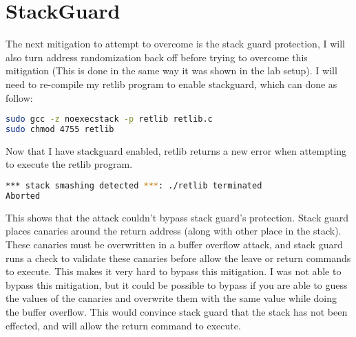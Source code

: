 \documentclass[14pt]{extarticle}
\begin{document}
\section{StackGuard}
The next mitigation to attempt to overcome is the stack guard protection, I will also turn address randomization back off before trying to overcome this mitigation (This is done in the same way it was shown in the lab setup). I will need to re-compile my retlib program to enable stackguard, which can done as follow\cite{seed-retlibc}:
\begin{lstlisting}[language=sh]
sudo gcc -z noexecstack -p retlib retlib.c
sudo chmod 4755 retlib
\end{lstlisting}
Now that I have stackguard enabled, retlib returns a new error when attempting to execute the retlib program.
\begin{lstlisting}[language=sh]
*** stack smashing detected ***: ./retlib terminated
Aborted
\end{lstlisting}
This shows that the attack couldn't bypass stack guard's protection. Stack guard places canaries around the return address (along with other place in the stack). These canaries must be overwritten in a buffer overflow attack, and stack guard runs a check to validate these canaries before allow the leave or return commands to execute. This makes it very hard to bypass this mitigation. I was not able to bypass this mitigation, but it could be possible to bypass if you are able to guess the values of the canaries and overwrite them with the same value while doing the buffer overflow. This would convince stack guard that the stack has not been effected, and will allow the return command to execute.
\end{document}
